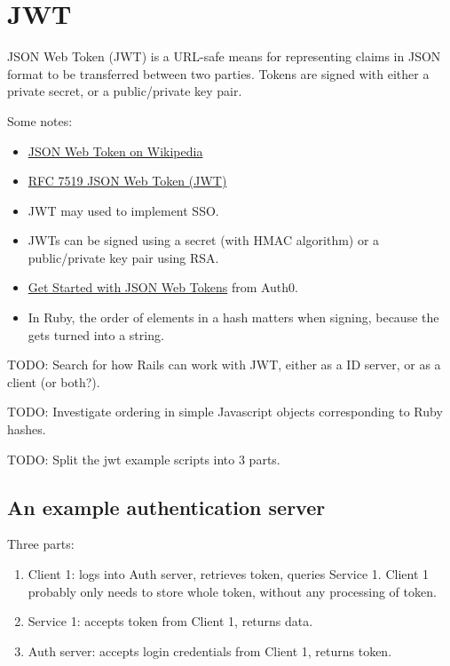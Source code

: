 \section{JWT}

JSON Web Token (JWT) is a URL-safe means for representing
claims in JSON format to be transferred between two parties.
Tokens are signed with either a private secret, or a public/private
key pair.


Some notes:

\begin{itemize}
  \item \href{https://en.wikipedia.org/wiki/JSON_Web_Token}{%
     JSON Web Token on Wikipedia}
  \item \href{https://tools.ietf.org/html/rfc7519}{%
     RFC 7519 JSON Web Token (JWT)}
 \item JWT may used to implement SSO.
 \item JWTs can be signed using a secret (with HMAC algorithm) or a
   public/private key pair using RSA.
 \item \href{https://auth0.com/learn/json-web-tokens/}{%
Get Started with JSON Web Tokens} from Auth0.
  \item In Ruby, the order of elements in a hash matters when signing, because the
        gets turned into a string.
\end{itemize}

TODO: Search for how Rails can work with JWT, either as a ID server,
or as a client (or both?).

TODO: Investigate ordering in simple Javascript objects corresponding to Ruby hashes.

TODO: Split the jwt example scripts into 3 parts.

\subsection{An example authentication server}

Three parts:

\begin{enumerate}
  \item Client 1: logs into Auth server, retrieves token, queries Service 1.
        Client 1 probably only needs to store whole token, without any processing of token.
  \item Service 1: accepts token from Client 1, returns data.
  \item Auth server: accepts login credentials from Client 1, returns token.
\end{enumerate}


